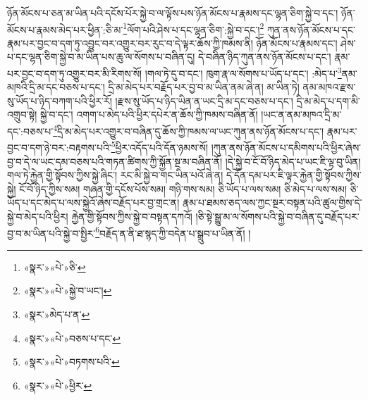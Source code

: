 ཉོན་མོངས་པ་ཅན་མ་ཡིན་པའི་དངོས་པོར་སྐྱེ་བ་ལ་ལྟོས་པས་ཉོན་མོངས་པ་རྣམས་དང་ལྷན་ཅིག་སྐྱེ་བ་དང་། ཉོན་མོངས་པ་རྣམས་མེད་པར་ཕྱིན་:ཅི་མ་\footnote{«སྣར་»«པེ་»ཅི་}ལོག་པའི་ཤེས་པ་དང་ལྷན་ཅིག་:སྐྱེ་བ་དང་།\footnote{«སྣར་»«པེ་»སྐྱེ་བ་ཡང་།} ཀུན་ནས་ཉོན་མོངས་པ་དང་རྣམ་པར་བྱང་བ་དག་ཏུ་འབྱུང་བར་འགྱུར་བར་རུང་བ་དེ་ལྟར་ཆོས་ཀྱི་ཁམས་ནི། ཉོན་མོངས་པ་རྣམས་དང་། ཤེས་པ་དང་ལྷན་ཅིག་སྐྱེ་བ་མ་ཡིན་པས་ཆུ་ལ་སོགས་པ་བཞིན་དུ། དེ་བཞིན་ཉིད་ཀུན་ནས་ཉོན་མོངས་པ་དང་། རྣམ་པར་བྱང་བ་དག་ཏུ་འགྱུར་བར་མི་རིགས་སོ། །གལ་ཏེ་དུ་བ་དང་། ཁུག་རྣ་ལ་སོགས་པ་ཡོད་པ་དང་། :མེད་པ་\footnote{«སྣར་»མེད་པ་ན་}ནམ་མཁའི་དྲི་མ་དང་བཅས་པ་དང་། དྲི་མ་མེད་པར་བརྗོད་པར་བྱ་བ་མ་ཡིན་ནམ་ཞེ་ན། མ་ཡིན་ཏེ། ནམ་མཁའ་རྫས་སུ་ཡོད་པ་ཉིད་བཀག་པའི་ཕྱིར་རོ། །རྫས་སུ་ཡོད་པ་ཉིད་ཡིན་ན་ཡང་དྲི་མ་དང་བཅས་པ་དང་། དྲི་མ་མེད་པ་དག་མི་འགྲུབ་སྟེ། སྐྱེ་བ་དང་། འགག་པ་མེད་པའི་ཕྱིར་དཔེར་ན་ཆོས་ཀྱི་ཁམས་བཞིན་ནོ། །ཡང་ན་ནམ་མཁའ་དྲི་མ་དང་:བཅས་པ་\footnote{«སྣར་»«པེ་»བཅས་པ་དང་}དྲི་མ་མེད་པར་འགྱུར་བ་བཞིན་དུ་ཆོས་ཀྱི་ཁམས་ལ་ཡང་ཀུན་ནས་ཉོན་མོངས་པ་དང་། རྣམ་པར་བྱང་བ་དག་ཉེ་བར་:བརྟགས་པའི་\footnote{«སྣར་»«པེ་»བཏགས་པའི་}ཕྱིར་འདོད་པའི་དོན་ཉམས་སོ། །ཀུན་ནས་ཉོན་མོངས་པ་དམིགས་པའི་ཕྱིར་ཞེས་བྱ་བ་དེ་ལ་ཡང་དམ་བཅས་པའི་གཏན་ཚིགས་ཀྱི་སྐྱོན་སྔ་མ་བཞིན་ནོ། །དེ་སྐྱེ་བ་ངོ་བོ་ཉིད་མེད་པ་ཡང་ཇི་ལྟ་བུ་ཡིན། གལ་ཏེ་རྐྱེན་གྱི་སྟོབས་ཀྱིས་སྐྱེ་ཞིང་། རང་མི་སྐྱེ་བ་གང་ཡིན་པའོ་ཞེ་ན། དེ་དོན་དམ་པར་ཇི་ལྟར་རྐྱེན་གྱི་སྟོབས་ཀྱིས་སྐྱེ། ངོ་བོ་ཉིད་ཀྱིས་སམ། གཞན་གྱི་དངོས་པོས་སམ། གཉི་གས་སམ། ཅི་ཡོད་པ་ལས་སམ། ཅི་མེད་པ་ལས་སམ། ཅི་ཡོད་པ་དང་མེད་པ་ལས་སྐྱེའོ་ཞེས་བརྗོད་པར་བྱ་གྲང་ན། རྣམ་པ་ཐམས་ཅད་ལས་ཀྱང་སྔར་བསྟན་པའི་ཚུལ་གྱིས་དེ་སྐྱེ་བ་མེད་པའི་ཕྱིར། རྐྱེན་གྱི་སྟོབས་ཀྱིས་སྐྱེ་བ་བསྟན་དཀའོ། །ཅི་སྟེ་སྒྱུ་མ་ལ་སོགས་པའི་སྐྱེ་བ་བཞིན་དུ་བརྗོད་པར་བྱ་བ་མ་ཡིན་པའི་སྐྱེ་བ་སྤྱིར་\footnote{«སྣར་»«པེ་»ཕྱིར་}བརྗོད་ན་ནི་ཐ་སྙད་ཀྱི་བདེན་པ་སྒྲུབ་པ་ཡིན་ནོ། །
